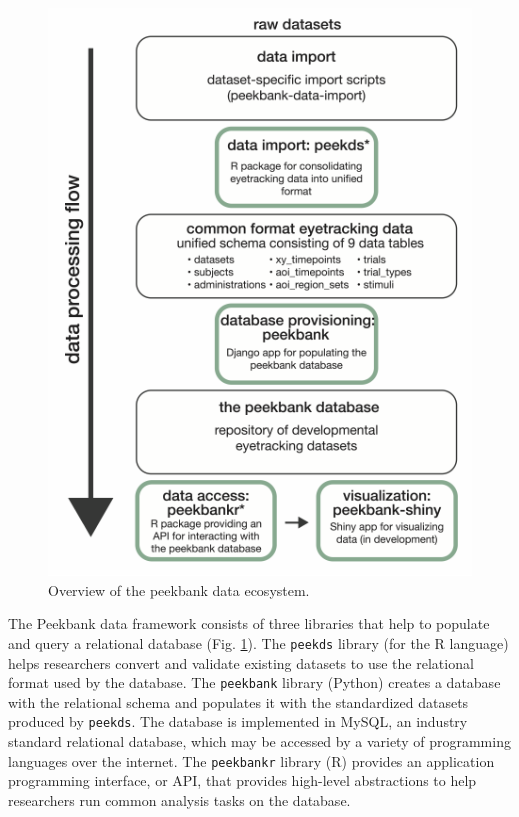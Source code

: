 \documentclass[10pt, letterpaper]{article}
\newenvironment{CodeChunk}{}{}
\begin{document}
\begin{CodeChunk}
\begin{figure}[tb]

{\centering \includegraphics{figs/fig_framework_overview-1}

}

\caption[Overview of the peekbank data ecosystem]{Overview of the peekbank data ecosystem.}\label{fig:fig_framework_overview}
\end{figure}
\end{CodeChunk}

The Peekbank data framework consists of three libraries that help to
populate and query a relational database (Fig.
\ref{fig:fig_framework_overview}). The \texttt{peekds} library (for the
R language) helps researchers convert and validate existing datasets to
use the relational format used by the database. The \texttt{peekbank}
library (Python) creates a database with the relational schema and
populates it with the standardized datasets produced by \texttt{peekds}.
The database is implemented in MySQL, an industry standard relational
database, which may be accessed by a variety of programming languages
over the internet. The \texttt{peekbankr} library (R) provides an
application programming interface, or API, that provides high-level
abstractions to help researchers run common analysis tasks on the
database.
\end{document}

